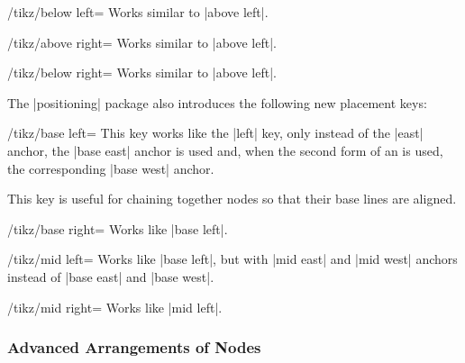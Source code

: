 \begin{key}{/tikz/below left=}
    Works similar to |above left|.
\end{key}

\begin{key}{/tikz/above right=}
    Works similar to |above left|.
\end{key}

\begin{key}{/tikz/below right=}
    Works similar to |above left|.
\end{key}

The |positioning| package also introduces the following new placement keys:
%
\begin{key}{/tikz/base left=}
    This key works like the |left| key, only instead of the |east| anchor, the
    |base east| anchor is used and, when the second form of an 
    is used, the corresponding |base west| anchor.

    This key is useful for chaining together nodes so that their base lines are
    aligned.
\begin{codeexample}[preamble={\usetikzlibrary{positioning}}]
\end{codeexample}
\end{key}

\begin{key}{/tikz/base right=}
    Works like |base left|.
\end{key}
\begin{key}{/tikz/mid left=}
    Works like |base left|, but with |mid east| and |mid west| anchors instead
    of |base east| and |base west|.
\end{key}

\begin{key}{/tikz/mid right=}
    Works like |mid left|.
\end{key}


\subsubsection{Advanced Arrangements of Nodes}

